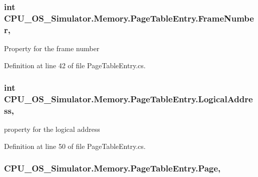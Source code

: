 \subsubsection[{Frame\+Number}]{\setlength{\rightskip}{0pt plus 5cm}int C\+P\+U\+\_\+\+O\+S\+\_\+\+Simulator.\+Memory.\+Page\+Table\+Entry.\+Frame\+Number\hspace{0.3cm}{\ttfamily [get]}, {\ttfamily [set]}}\label{class_c_p_u___o_s___simulator_1_1_memory_1_1_page_table_entry_a4c1fb37bb101546867d77a4f781ba51d}


Property for the frame number 



Definition at line 42 of file Page\+Table\+Entry.\+cs.

\hypertarget{class_c_p_u___o_s___simulator_1_1_memory_1_1_page_table_entry_a22a89428526ff3d2c8247a14eba38242}{}
\subsubsection[{Logical\+Address}]{\setlength{\rightskip}{0pt plus 5cm}int C\+P\+U\+\_\+\+O\+S\+\_\+\+Simulator.\+Memory.\+Page\+Table\+Entry.\+Logical\+Address\hspace{0.3cm}{\ttfamily [get]}, {\ttfamily [set]}}\label{class_c_p_u___o_s___simulator_1_1_memory_1_1_page_table_entry_a22a89428526ff3d2c8247a14eba38242}


property for the logical address 



Definition at line 50 of file Page\+Table\+Entry.\+cs.

\hypertarget{class_c_p_u___o_s___simulator_1_1_memory_1_1_page_table_entry_aa592969e0204f85ad96a9ab76ca7f50d}{}
\subsubsection[{Page}]{ C\+P\+U\+\_\+\+O\+S\+\_\+\+Simulator.\+Memory.\+Page\+Table\+Entry.\+Page\hspace{0.3cm}{\ttfamily [get]}, {\ttfamily [set]}}\label{class_c_p_u___o_s___simulator_1_1_memory_1_1_page_table_entry_aa592969e0204f85ad96a9ab76ca7f50d}


